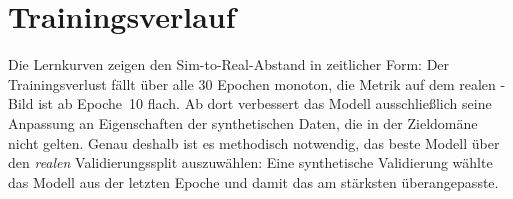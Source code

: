 \section{Trainingsverlauf}
\label{sec:trainingsverlauf}


Die Lernkurven zeigen den Sim-to-Real-Abstand in zeitlicher Form: Der
Trainingsverlust fällt über alle 30 Epochen monoton, die Metrik auf dem realen
-Bild ist ab Epoche~10 flach. Ab dort verbessert das
Modell ausschließlich seine Anpassung an Eigenschaften der synthetischen Daten,
die in der Zieldomäne nicht gelten. Genau deshalb ist es methodisch notwendig,
das beste Modell über den \emph{realen} Validierungssplit auszuwählen: Eine
synthetische Validierung wählte das Modell aus der letzten Epoche und damit das
am stärksten überangepasste.
